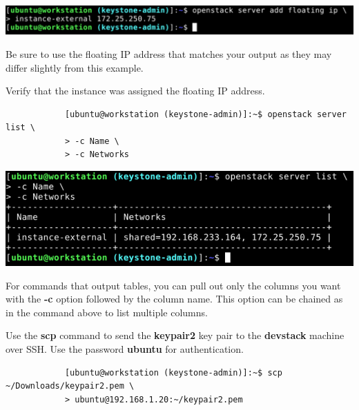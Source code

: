 \documentclass[letterpaper, 12pt]{article}
\begin{document}
\begin{enumerate}
\begin{labstep}
        \begin{center}
            \includegraphics[width=\linewidth]{images/part6/step5.png}
        \end{center}
    \end{labstep}

    \begin{notebox}
        Be sure to use the floating IP address that matches your output as they may differ slightly from this example.
    \end{notebox}

    \begin{labstep}
        Verify that the instance was assigned the floating IP address.
        \begin{lstlisting}
            [ubuntu@workstation (keystone-admin)]:~$ openstack server list \
            > -c Name \
            > -c Networks
        \end{lstlisting}

        \begin{center}
            \includegraphics[width=\linewidth]{images/part6/step6.png}
        \end{center}
    \end{labstep}

    \begin{tipbox}
        For commands that output tables, you can pull out only the columns you want with the \textbf{-c} option followed by the column name.
        This option can be chained as in the command above to list multiple columns.
    \end{tipbox}

    \begin{labstep}
        Use the \textbf{scp} command to send the \textbf{keypair2} key pair to the \textbf{devstack} machine over SSH.
        Use the password \textbf{ubuntu} for authentication.
        \begin{lstlisting}
            [ubuntu@workstation (keystone-admin)]:~$ scp ~/Downloads/keypair2.pem \
            > ubuntu@192.168.1.20:~/keypair2.pem
        \end{lstlisting}


\end{labstep}
\end{enumerate}
\end{document}
